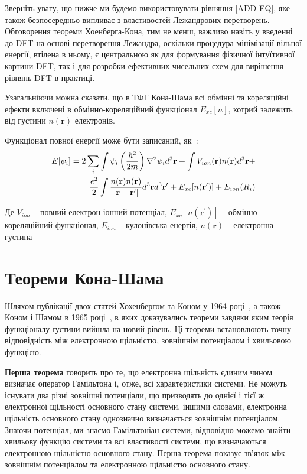 Зверніть увагу, що нижче ми будемо використовувати рівняння [ADD EQ], яке також безпосередньо випливає з властивостей Лежандрових перетворень. Обговорення теореми Хоенберга-Кона, тим не менш, важливо навіть у введенні до DFT на основі перетворення Лежандра, оскільки процедура мінімізації вільної енергії, втілена в ньому, є центральною як для формування фізичної інтуїтивної картини DFT, так і для розробки ефективних чисельних схем для вирішення рівнянь DFT в практиці.

Узагальніючи можна сказати, що в ТФГ Кона-Шама всі обмінні та кореляційні ефекти включені в обмінно-кореляційний функціонал $E_{xc}[n]$, котрий залежить від густини $n(\textbf{r})$ електронів. 


Функціонал повної енергії може бути записаний, як~\cite{K-S energy}:
\begin{eqnarray}
 E[\psi_i] = 2\sum\limits_{i}\int\psi_i\left({{\hbar^2}\over{2m}}\right)\nabla^2\psi_id^3\textbf{r}+\int V_{ion}(\textbf{r})n(\textbf{r})d^3\textbf{r}+\nonumber \\
 {{e^2}\over{2}}\int {{n(\textbf{r})n(\textbf{r})}\over{|\textbf{r}-\textbf{r}^\prime|}}d^3\textbf{r}d^3\textbf{r}^\prime+E_{xc}[n(\textbf{r}^\prime)]+E_{ion}(R_i)
\end{eqnarray}

Де $V_{ion}$ -- повний електрон-іонний потенціал, $E_{xc}[n(\textbf{r}^\prime)]$ -- обмінно-кореляційний функціонал, $E_{ion}$ -- кулонівська енергія, $n(\textbf{r})$ -- електронна густина

\section{Теореми Кона-Шама}
Шляхом публікації двох статей Хохенбергом та Коном у 1964 році~\cite{Hohenberg&Khon}, а також Коном і Шамом в 1965 році~\cite{Khon&Sham}, в яких доказувались теореми завдяки яким теорія функціоналу ґустини вийшла на новий рівень. Ці теореми встановлюють точну відповідність між електронною щільністю, зовнішнім потенціалом і хвильовою функцією.

\textbf{Перша теорема} говорить про те, що електронна щільність єдиним чином визначає оператор Гамільтона і, отже, всі характеристики системи.
Не можуть існувати два різні зовнішні потенціали, що призводять до однієї і тієї ж електронної щільності основного стану системи, іншими словами, електронна щільність основного стану однозначно визначається зовнішнім потенціалом.
Знаючи потенціал, ми знаємо Гамільтоніан системи, відповідно можемо знайти хвильову функцію системи та всі властивості системи, що визначаються електронною щільністю основного стану. Перша теорема показує зв'язок між зовнішнім потенціалом та електронною щільністю основного стану.

